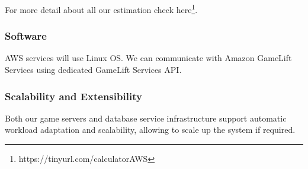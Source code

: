 For more detail about all our estimation check here\footnote{https://tinyurl.com/calculatorAWS }.
\subsubsection{Software}
AWS services will use Linux OS. We can communicate with Amazon GameLift Services using dedicated GameLift Services API.
\subsubsection{Scalability and Extensibility}
Both our game servers and database service infrastructure support automatic workload adaptation and scalability, allowing to scale up the system if required. \\